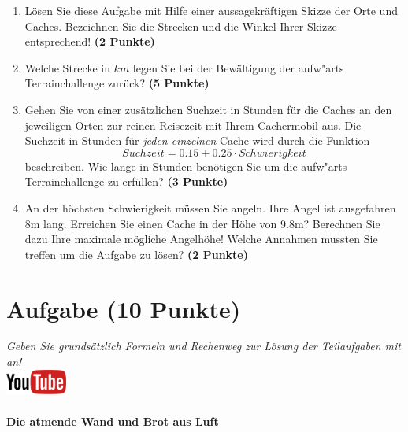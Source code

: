 \documentclass[a4paper, 9pt]{scrartcl}\usepackage[]{graphicx}\usepackage[]{xcolor}
\begin{document}
\begin{enumerate}
\item L{\"o}sen Sie diese Aufgabe mit Hilfe einer aussagekr{\"a}ftigen Skizze der
  Orte und Caches. Bezeichnen Sie die Strecken und die Winkel Ihrer Skizze
  entsprechend! \textbf{(2 Punkte)}
\item Welche Strecke in $km$ legen Sie bei der Bew{\"a}ltigung der
  aufw{"a}rts Terrainchallenge zur{\"u}ck? \textbf{(5
    Punkte)}
\item Gehen Sie von einer zus{\"a}tzlichen Suchzeit in Stunden f{\"u}r die
  Caches an den jeweiligen Orten zur reinen Reisezeit mit Ihrem Cachermobil
  aus. Die Suchzeit in Stunden f{\"u}r \textit{jeden einzelnen} Cache wird durch die
  Funktion
  \begin{equation*}
    Suchzeit = 0.15 + 0.25 \cdot Schwierigkeit
  \end{equation*}  
  beschreiben.  Wie lange in Stunden ben{\"o}tigen Sie um die
  aufw{"a}rts Terrainchallenge zu erf{\"u}llen? \textbf{(3 Punkte)}
\item An der h{\"o}chsten Schwierigkeit m{\"u}ssen Sie angeln. Ihre Angel ist
  ausgefahren 8m lang. Erreichen Sie einen Cache in der H{\"o}he
  von 9.8m?  Berechnen Sie dazu Ihre maximale m{\"o}gliche
  Angelh{\"o}he! Welche Annahmen mussten Sie treffen um die Aufgabe zu l{\"o}sen? \textbf{(2 Punkte)} 
\end{enumerate}

 
\clearpage

\section{Aufgabe \hfill (10 Punkte)}

\textit{Geben Sie grunds{\"a}tzlich Formeln und Rechenweg zur L{\"o}sung der
  Teilaufgaben mit an!} \\[1Ex]

\hfill\href{https://youtu.be/4-dSaPMhK9s}{\includegraphics[width =
  2cm]{img/youtube}} %
\hspace{2Ex}

\paragraph{Die atmende Wand und Brot aus Luft}
\end{document}
